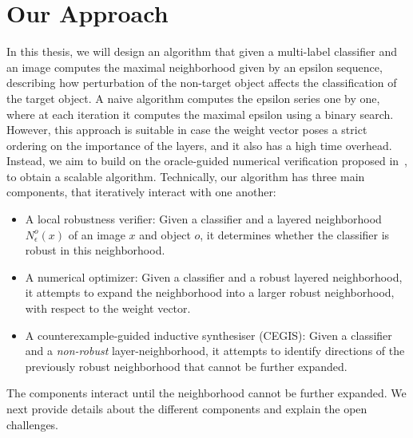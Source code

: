
\section{Our Approach}

In this thesis, we will design an algorithm that given a multi-label classifier and an image computes the maximal neighborhood given by an epsilon sequence, describing how perturbation of the non-target object affects the classification of the target object.
A naive algorithm computes the epsilon series one by one, where at each iteration it computes the maximal epsilon using a binary search.
However, this approach is suitable in case the weight vector poses a strict ordering on the importance of the layers, and it also has a high time overhead.
Instead, we aim to build on the oracle-guided numerical verification proposed in~\cite{MARVEL}, to obtain a scalable algorithm.
Technically, our algorithm has three main components, that iteratively interact with one another:
\begin{itemize}
    \item A local robustness verifier: Given a classifier and a layered neighborhood ${N^{o}_\epsilon}(x)$ of an image $x$ and object $o$, it determines whether the classifier is robust in this neighborhood.
        \item A numerical optimizer: Given a classifier and a robust layered neighborhood, it attempts to expand the neighborhood into a larger robust neighborhood, with respect to the weight vector. %
    \item A counterexample-guided inductive synthesiser (CEGIS): Given a classifier and a \emph{non-robust} layer-neighborhood, it attempts to identify directions of the previously robust neighborhood that cannot be further expanded. 
    \end{itemize}
The components interact until the neighborhood cannot be further expanded.
We next provide details about the different components and explain the open challenges.

